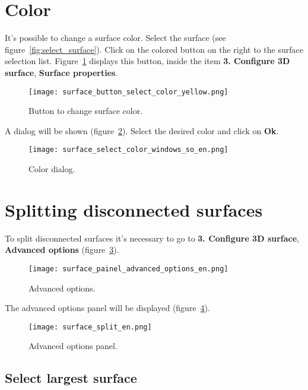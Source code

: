 \newpage

\section{Color}

It's possible to change a surface color. Select the surface (see figure~\ref{fig:select_surface}). Click on the colored button on the right to the surface selection list. Figure~\ref{fig:change_surface_color} displays this button, inside the item \textbf{3. Configure 3D surface}, \textbf{Surface properties}.

\begin{figure}[!htb]
\centering
\texttt{[image: surface\_button\_select\_color\_yellow.png]}
\caption{Button to change surface color.}
\label{fig:change_surface_color}
\end{figure}

A dialog will be shown (figure~\ref{fig:button_select_color}). Select the desired color and click on \textbf{Ok}.

\begin{figure}[!htb]
\centering
\texttt{[image: surface\_select\_color\_windows\_so\_en.png]}
\caption{Color dialog.}
\label{fig:button_select_color}
\end{figure}

\section{Splitting disconnected surfaces}

To split disconnected surfaces it's necessary to go to \textbf{3. Configure 3D surface}, \textbf{Advanced options} (figure~\ref{fig:advanced_tools}).

\begin{figure}[!htb]
\centering
\texttt{[image: surface\_painel\_advanced\_options\_en.png]}
\caption{Advanced options.}
\label{fig:advanced_tools}
\end{figure}

\newpage

The advanced options panel will be displayed (figure~\ref{fig:advanced_tools_expanded}).

\begin{figure}[!htb]
\centering
\texttt{[image: surface\_split\_en.png]}
\caption{Advanced options panel.}
\label{fig:advanced_tools_expanded}
\end{figure}

\subsection{Select largest surface}

